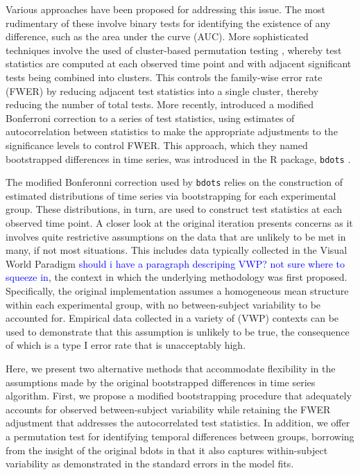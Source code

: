 \documentclass{article}
\newcommand{\xt}{\texttt}
\providecommand{\cn}[1]{\textcolor{blue}{#1}}
\begin{document}
Various approaches have been proposed for addressing this issue. The most rudimentary of these involve binary tests for identifying the existence of any difference, such as the area under the curve (AUC).  More sophisticated techniques involve the used of cluster-based permutation testing \citep{Maris2007}, whereby test statistics are computed at each observed time point and with adjacent significant tests being combined into clusters. This controls the family-wise error rate (FWER) by reducing adjacent test statistics into a single cluster, thereby reducing the number of total tests. More recently, \citet{oleson2017detecting} introduced a modified Bonferroni correction to a series of test statistics, using estimates of autocorrelation between statistics to make the appropriate adjustments to the significance levels to control FWER. This approach, which they named bootstrapped differences in time series, was introduced in the R package, \xt{bdots} \citep{seedorff2018bdots}.

The modified Bonferonni correction used by \xt{bdots} relies on the construction of estimated distributions of time series via bootstrapping for each experimental group. These distributions, in turn, are used to construct test statistics at each observed time point. A closer look at the original iteration presents concerns as it involves quite restrictive assumptions on the data that are unlikely to be met in many, if not most situations. This includes data typically collected in the Visual World Paradigm \cn{should i have a paragraph descriping VWP? not sure where to squeeze in}, the context in which the underlying methodology was first proposed. Specifically, the original implementation assumes a homogeneous mean structure within each experimental group, with no between-subject variability to be accounted for. Empirical data collected in a variety of (VWP) contexts can be used to demonstrate that this assumption is unlikely to be true, the consequence of which is a type I error rate that is unacceptably high.

Here, we present two alternative methods that accommodate flexibility in the assumptions made by the original bootstrapped differences in time series algorithm. First, we propose a modified bootstrapping procedure that adequately accounts for observed between-subject variability while retaining the FWER adjustment that addresses the autocorrelated test statistics. In addition, we offer a permutation test for identifying temporal differences between groups, borrowing from the insight of the original bdots in that it also captures within-subject variability as demonstrated in the standard errors in the model fits.
\end{document}
